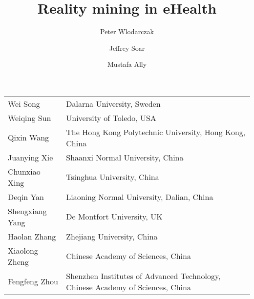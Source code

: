 \documentclass{llncs}
\begin{document}
\begin{tabular}{@{}p{5cm}@{}p{7.2cm}@{}}
Wei	Song	& Dalarna University, Sweden \\
Weiqing Sun & University of Toledo, USA \\
Qixin	Wang	& The Hong Kong Polytechnic University, Hong Kong, China \\
Juanying Xie & Shaanxi Normal University, China \\
Chunxiao Xing & Tsinghua University, China \\
Deqin	Yan	&	Liaoning Normal University, Dalian, China \\
Shengxiang	Yang &	De Montfort University, UK \\
Haolan	Zhang	& Zhejiang University, China \\
Xiaolong	Zheng	& Chinese Academy of Sciences, China \\
Fengfeng	Zhou & Shenzhen Institutes of Advanced Technology, \hfil\break	Chinese Academy of Sciences, China
%
\end{tabular}

%
%
%
\tableofcontents
%
\mainmatter              %



\title{Reality mining in eHealth}
%
%
\author{Peter Wlodarczak \and Jeffrey Soar \and Mustafa Ally}
%
%



%
\end{document}
